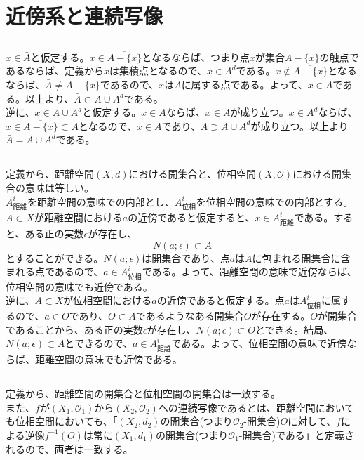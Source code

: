 \documentclass{jsarticle}
\begin{document}
\section{近傍系と連続写像}
\subsection{}
$x\in\bar{A}$と仮定する。$x\in \overline{A-\{x\}}$となるならば、つまり点$x$が集合$A-\{x\}$の触点であるならば、定義から$x$は集積点となるので、$x\in A^d$である。$x\notin\overline{A-\{x\}}$となるならば、$\bar{A}\neq\overline{A-\{x\}}$であるので、$x$は$A$に属する点である。よって、$x\in A$である。以上より、$\bar{A}\subset A\cup A^d$である。\\
逆に、$x\in A\cup A^d$と仮定する。$x\in A$ならば、$x\in \bar{A}$が成り立つ。$x\in A^d$ならば、$x\in\overline{A-\{x\}}\subset \bar{A}$となるので、$x\in\bar{A}$であり、$\bar{A}\supset A\cup A^d$が成り立つ。以上より$\bar{A}= A\cup A^d$である。

\subsection{}
定義から、距離空間$(X,d)$における開集合と、位相空間$(X,\mathcal{O})$における開集合の意味は等しい。\\
$A^i_{距離}$を距離空間の意味での内部とし、$A^i_{位相}$を位相空間の意味での内部とする。\\
$A\subset X$が距離空間における$a$の近傍であると仮定すると、$x\in A^i_{距離}$である。すると、ある正の実数$\epsilon$が存在し、
\[N(a;\epsilon)\subset A\]
とすることができる。$N(a;\epsilon)$は開集合であり、点$a$は$A$に包まれる開集合に含まれる点であるので、$a\in A^i_{位相}$である。よって、距離空間の意味で近傍ならば、位相空間の意味でも近傍である。\\
逆に、$A\subset X$が位相空間における$a$の近傍であると仮定する。点$a$は$A^i_{位相}$に属するので、$a\in O$であり、$O\subset A$であるようなある開集合$O$が存在する。$O$が開集合であることから、ある正の実数$\epsilon$が存在し、$N(a;\epsilon)\subset O$とできる。結局、$N(a;\epsilon)\subset A$とできるので、$a\in A^i_{距離}$である。よって、位相空間の意味で近傍ならば、距離空間の意味でも近傍である。

\subsection{}
定義から、距離空間の開集合と位相空間の開集合は一致する。\\
また、$f$が$(X_1,\mathcal{O}_1)$から$(X_2,\mathcal{O}_2)$への連続写像であるとは、距離空間においても位相空間においても、「$(X_2,d_2)$の開集合(つまり$\mathcal{O}_2$-開集合)$O$に対して、$f$による逆像$f^{-1}(O)$は常に$(X_1,d_1)$の開集合(つまり$\mathcal{O}_1$-開集合)である」と定義されるので、両者は一致する。
\end{document}
